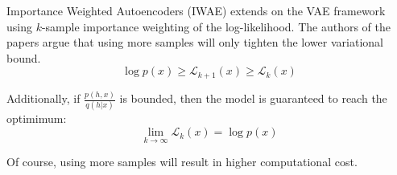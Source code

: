Importance Weighted Autoencoders (IWAE) extends on the VAE framework using $k$-sample importance weighting of the log-likelihood.
The authors of the papers argue that using more samples will only tighten the lower variational bound.
$$
\log p(x) \geq \mathcal{L}_{k+1}(x) \geq \mathcal{L}_{k}(x)
$$

Additionally, if $\frac{p(h,x)}{q(h|x)}$ is bounded, then the model is guaranteed to reach the optimimum:
$$
\lim_{k \rightarrow \infty} \mathcal{L}_{k}(x) = \log p(x)
$$

Of course, using more samples will result in higher computational cost.
